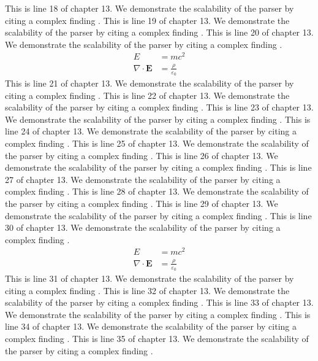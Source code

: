 This is line 18 of chapter 13. We demonstrate the scalability of the parser by citing a complex finding \cite{ref13_18}.
This is line 19 of chapter 13. We demonstrate the scalability of the parser by citing a complex finding \cite{ref13_19}.
This is line 20 of chapter 13. We demonstrate the scalability of the parser by citing a complex finding \cite{ref13_20}.
\begin{align*}
  E &= mc^2 \\
  \nabla \cdot \mathbf{E} &= \frac{\rho}{\varepsilon_0}
\end{align*}
This is line 21 of chapter 13. We demonstrate the scalability of the parser by citing a complex finding \cite{ref13_21}.
This is line 22 of chapter 13. We demonstrate the scalability of the parser by citing a complex finding \cite{ref13_22}.
This is line 23 of chapter 13. We demonstrate the scalability of the parser by citing a complex finding \cite{ref13_23}.
This is line 24 of chapter 13. We demonstrate the scalability of the parser by citing a complex finding \cite{ref13_24}.
This is line 25 of chapter 13. We demonstrate the scalability of the parser by citing a complex finding \cite{ref13_25}.
This is line 26 of chapter 13. We demonstrate the scalability of the parser by citing a complex finding \cite{ref13_26}.
This is line 27 of chapter 13. We demonstrate the scalability of the parser by citing a complex finding \cite{ref13_27}.
This is line 28 of chapter 13. We demonstrate the scalability of the parser by citing a complex finding \cite{ref13_28}.
This is line 29 of chapter 13. We demonstrate the scalability of the parser by citing a complex finding \cite{ref13_29}.
This is line 30 of chapter 13. We demonstrate the scalability of the parser by citing a complex finding \cite{ref13_30}.
\begin{align*}
  E &= mc^2 \\
  \nabla \cdot \mathbf{E} &= \frac{\rho}{\varepsilon_0}
\end{align*}
This is line 31 of chapter 13. We demonstrate the scalability of the parser by citing a complex finding \cite{ref13_31}.
This is line 32 of chapter 13. We demonstrate the scalability of the parser by citing a complex finding \cite{ref13_32}.
This is line 33 of chapter 13. We demonstrate the scalability of the parser by citing a complex finding \cite{ref13_33}.
This is line 34 of chapter 13. We demonstrate the scalability of the parser by citing a complex finding \cite{ref13_34}.
This is line 35 of chapter 13. We demonstrate the scalability of the parser by citing a complex finding \cite{ref13_35}.
